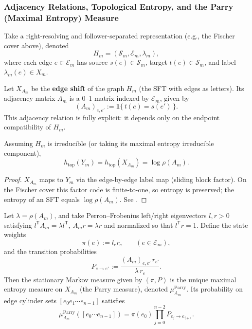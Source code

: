 \subsubsection{Adjacency Relations, Topological Entropy, and the Parry (Maximal Entropy) Measure}\label{subsubsec:Ym-adjacency-entropy-parry}
Take a right-resolving and follower-separated representation (e.g., the Fischer cover above), denoted
\[
H_m=(\mathcal{S}_m,\mathcal{E}_m,\lambda_m),
\]
where each edge $e\in\mathcal{E}_m$ has source $s(e)\in\mathcal{S}_m$, target $t(e)\in\mathcal{S}_m$, and label $\lambda_m(e)\in X_m$.

\begin{definition}\label{def:Phi_m-adjacency}
Let $X_{A_m}$ be the \textbf{edge shift} of the graph $H_m$ (the SFT with edges as letters). Its adjacency matrix $A_m$ is a $0$--$1$ matrix indexed by $\mathcal{E}_m$, given by
\[
(A_m)_{e,e'}:=\mathbf{1}\{\,t(e)=s(e')\,\}.
\]
This adjacency relation is fully explicit: it depends only on the endpoint compatibility of $H_m$.
\end{definition}

\begin{proposition}\label{prop:Phi_m-entropy}
Assuming $H_m$ is irreducible (or taking its maximal entropy irreducible component),
\[
h_{\mathrm{top}}(Y_m)=h_{\mathrm{top}}(X_{A_m})=\log\rho(A_m).
\]
\end{proposition}

\begin{proof}
$X_{A_m}$ maps to $Y_m$ via the edge-by-edge label map (sliding block factor). On the Fischer cover this factor code is finite-to-one, so entropy is preserved; the entropy of an SFT equals $\log\rho(A_m)$. See \cite{LindMarcus1995,Kitchens1998SymbolicDynamics}.
\end{proof}

\begin{proposition}\label{prop:Phi_m-parry}
Let $\lambda=\rho(A_m)$, and take Perron--Frobenius left/right eigenvectors $l,r>0$ satisfying
\(
l^{\mathsf T}A_m=\lambda l^{\mathsf T},\ A_m r=\lambda r
\)
and normalized so that $l^{\mathsf T}r=1$. Define the state weights
\[
\pi(e):=l_e r_e\qquad (e\in\mathcal{E}_m),
\]
and the transition probabilities
\[
P_{e\to e'}:=\frac{(A_m)_{e,e'}\,r_{e'}}{\lambda\, r_e}.
\]
Then the stationary Markov measure given by $(\pi,P)$ is the unique maximal entropy measure on $X_{A_m}$ (the Parry measure), denoted $\mu_{A_m}^{\mathrm{Parry}}$.
Its probability on edge cylinder sets $[e_0e_1\cdots e_{n-1}]$ satisfies
\[
\mu_{A_m}^{\mathrm{Parry}}([e_0\cdots e_{n-1}])=\pi(e_0)\prod_{j=0}^{n-2} P_{e_j\to e_{j+1}}.
\]
\end{proposition}

